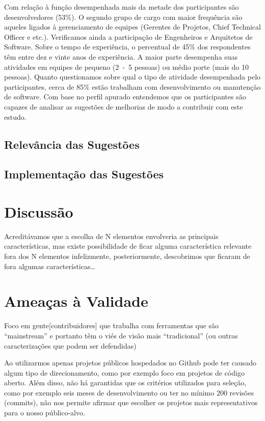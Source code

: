 Com relação à função desempenhada mais da metade dos participantes são
desenvolvedores (53\%). O segundo grupo de cargo com maior frequência são
aqueles ligados à gerenciamento de equipes (Gerentes de Projetos, Chief
Technical Officer e etc.). Verificamos ainda a participação de Engenheiros e
Arquitetos de Software. Sobre o tempo de experiência, o percentual de 45\% dos
respondentes têm entre dez e vinte anos de experiência. A maior parte desempenha
suas atividades em equipes de pequeno (2~-~5 pessoas) ou médio porte (mais do 10
pessoas). Quanto questionamos sobre qual o tipo de atividade desempenhada pelo
participantes, cerca de 85\% estão trabalham com desenvolvimento ou manutenção
de software. Com base no perfil apurado entendemos que os participantes são
capazes de analisar as sugestões de melhorias de modo a contribuir com este
estudo.

\subsection{Relevância das Sugestões}
\label{sub:sug_melhorias_resultados_relevancia}

\subsection{Implementação das Sugestões}
\label{sub:sug_melhorias_resultados_implementacao}

\section{Discussão}
\label{sec:sug_melhoria_discussao}

Acreditávamos que a escolha de N elementos envolveria as principais
características, mas existe possibilidade de ficar alguma característica
relevante fora dos N elementos infelizmente, posteriormente, descobrimos que
ficaram de fora algumas características\dots

\section{Ameaças à Validade}
\label{sec:sug_melhoria_ameacas}

Foco em gente[contribuidores] que trabalha com ferramentas que são
``mainstream'' e portanto têm o viés de visão mais ``tradicional'' (ou outras
caracterizações que podem ser defendidas)

Ao utilizarmos apenas projetos públicos hospedados no Github pode ter causado
algum tipo de direcionamento, como por exemplo foco em projetos de código
aberto. Além disso, não há garantidas que os critérios utilizados para seleção,
como por exemplo seis meses de desenvolvimento ou ter no mínimo 200 revisões
(commits), não nos permite afirmar que escolher os projetos mais
representativos para o nosso público-alvo.

